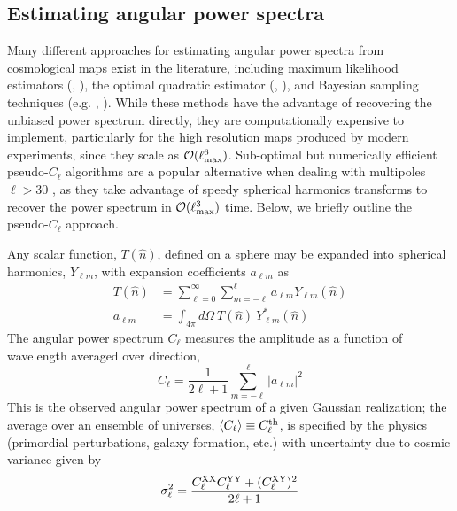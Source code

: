 \subsection{Estimating angular power spectra}

Many different approaches for estimating angular power spectra from cosmological maps exist in the literature, including maximum likelihood estimators (\citealt{Bond++98}, \citealt{WandeltHansen03}), the optimal quadratic estimator (\citealt{Tegmark97}, \citealt{Tegmark++01}), and Bayesian sampling techniques (e.g. \citealt{Eriksen++04}, \citealt{Taylor++08}). While these methods have the advantage of recovering the unbiased power spectrum directly, they are computationally expensive to implement, particularly for the high resolution maps produced by modern experiments, since they scale as $\mathcal{O}(\ell_{\rm max}^6)$. Sub-optimal but numerically efficient pseudo-$C_{\ell}$ algorithms \citep{MASTER} are a popular alternative when dealing with multipoles $\ell > 30$ \citep{Efstathiou04a}, as they take advantage of speedy spherical harmonics transforms to recover the power spectrum in $\mathcal{O}(\ell_{\rm max}^3)$ time. Below, we briefly outline the pseudo-$C_{\ell}$ approach.

Any scalar function, $T(\hat{n})$, defined on a sphere may be expanded into spherical harmonics, $Y_{\ell m}$, with expansion coefficients $a_{\ell m}$ as
\begin{align}
    T(\hat{n}) &= \sum_{\ell=0}^{\infty} \sum_{m=-\ell}^{\ell} a_{\ell m} Y_{\ell m}(\hat{n}) \\ 
    a_{\ell m} &= \int_{4\pi}d\Omega \ T(\hat{n}) \ Y^{*}_{\ell m}(\hat{n})
\end{align}
The angular power spectrum $C_{\ell}$ measures the amplitude as a function of wavelength averaged over direction,
\begin{equation}
    C_{\ell} = \frac{1}{2\ell + 1}\sum_{m=-\ell}^{\ell} |a_{\ell m}|^2
\end{equation}
This is the observed angular power spectrum of a given Gaussian realization; the average over an ensemble of universes, $\langle C_{\ell} \rangle \equiv C_{\ell}^{\rm th}$, is specified by the physics (primordial perturbations, galaxy formation, etc.) with uncertainty due to cosmic variance given by
\begin{align}
    \sigma_{\ell}^2 = \frac{C^{\rm XX}_{\ell}C^{\rm YY}_{\ell} + (C^{\rm XY}_{\ell})^2}{2\ell + 1}
\end{align}

